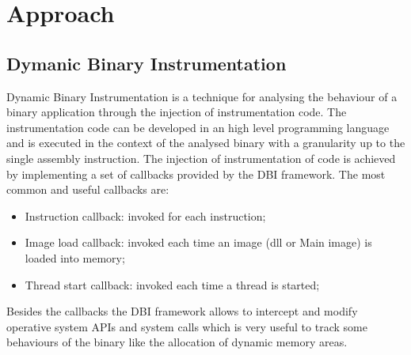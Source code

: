 \chapter{Approach}
\label{chapter3}
\thispagestyle{empty}

\section{Dymanic Binary Instrumentation}
Dynamic Binary Instrumentation is a technique for analysing the behaviour of a binary application through the injection of instrumentation code. The instrumentation code can be developed in an high level programming language and is executed in the context of the analysed binary with a granularity up to the single assembly instruction. The injection of instrumentation of code is achieved by implementing a set of callbacks provided by the DBI framework. The most common and useful callbacks are:
\begin{itemize}
 \item Instruction callback: invoked for each instruction;
 \item Image load callback: invoked each time an image (dll or Main image) is loaded into memory;
  \item Thread start callback: invoked each time a thread is started;
\end{itemize}
Besides the callbacks the DBI framework allows to intercept and modify operative system APIs and system calls which is very useful to track some behaviours of the binary like the allocation of dynamic memory areas.



